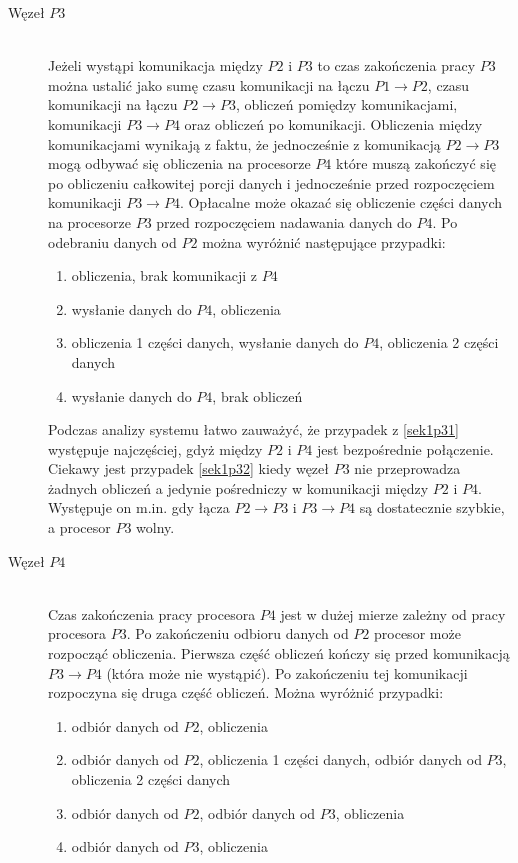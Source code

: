 \begin{description}
\item[Węzeł $P3$] \hfill \\

Jeżeli wystąpi komunikacja między $P2$ i $P3$ to czas zakończenia pracy $P3$ można ustalić jako sumę czasu komunikacji na łączu $P1 \to P2$,
czasu komunikacji na łączu $P2 \to P3$, obliczeń pomiędzy komunikacjami, komunikacji $P3 \to P4$ oraz obliczeń po komunikacji.
Obliczenia między komunikacjami wynikają z faktu, że jednocześnie z komunikacją $P2 \to P3$ mogą odbywać się obliczenia na procesorze $P4$
które muszą zakończyć się po obliczeniu całkowitej porcji danych i jednocześnie przed rozpoczęciem komunikacji $P3 \to P4$.
Opłacalne może okazać się obliczenie części danych na procesorze $P3$ przed rozpoczęciem nadawania danych do $P4$.
Po odebraniu danych od $P2$ można wyróżnić następujące przypadki:

\begin{enumerate}
\item obliczenia, brak komunikacji z $P4$ \label{sek1p31}
\item wysłanie danych do $P4$, obliczenia
\item obliczenia 1 części danych, wysłanie danych do $P4$, obliczenia 2 części danych
\item wysłanie danych do $P4$, brak obliczeń \label{sek1p32}
\end{enumerate}

Podczas analizy systemu łatwo zauważyć, że przypadek z \ref{sek1p31} występuje najczęściej, gdyż między $P2$ i $P4$ jest bezpośrednie połączenie.
Ciekawy jest przypadek \ref{sek1p32} kiedy węzeł $P3$ nie przeprowadza żadnych obliczeń a jedynie pośredniczy w komunikacji między $P2$ i $P4$.
Występuje on m.in. gdy łącza $P2 \to P3$ i $P3 \to P4$ są dostatecznie szybkie, a procesor $P3$ wolny.

\item[Węzeł $P4$] \hfill \\

Czas zakończenia pracy procesora $P4$ jest w dużej mierze zależny od pracy procesora $P3$. Po zakończeniu odbioru danych od $P2$ procesor może rozpocząć obliczenia.
Pierwsza część obliczeń kończy się przed komunikacją $P3 \to P4$ (która może nie wystąpić). Po zakończeniu tej komunikacji rozpoczyna się druga część obliczeń.
Można wyróżnić przypadki:

\begin{enumerate}
\item odbiór danych od $P2$, obliczenia
\item odbiór danych od $P2$, obliczenia 1 części danych, odbiór danych od $P3$, obliczenia 2 części danych
\item odbiór danych od $P2$, odbiór danych od $P3$, obliczenia
\item odbiór danych od $P3$, obliczenia
\end{enumerate}


\end{description}
